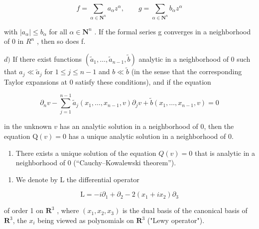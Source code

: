 \[
f = \sum_ {\alpha \in \mathbf {N} ^ {n}} a _ {\alpha} z ^ {\alpha}, \qquad g = \sum_ {\alpha \in \mathbf {N} ^ {n}} b _ {\alpha} z ^ {\alpha}
\]

with \(|a_{\alpha}| \leqslant b_{\alpha}\) for all \(\alpha \in \mathbf{N}^{n}\) . If the formal series g converges in a neighborhood of 0 in \(R^{n}\) , then so does f.

\(d)\) If there exist functions \((\widetilde{a}_1, \ldots, \widetilde{a}_{n-1}, \widetilde{b})\) analytic in a neighborhood of 0 such that \(a_j \ll \widetilde{a}_j\) for \(1 \leqslant j \leqslant n-1\) and \(b \ll \widetilde{b}\) (in the sense that the corresponding Taylor expansions at 0 satisfy these conditions), and if the equation

\[
\partial_ {n} v - \sum_ {j = 1} ^ {n - 1} \widetilde {a} _ {j} (x _ {1}, \dots , x _ {n - 1}, v) \partial_ {j} v + \widetilde {b} (x _ {1}, \dots , x _ {n - 1}, v) = 0
\]

in the unknown \(v\) has an analytic solution in a neighborhood of 0, then the equation \(\mathrm{Q}(v) = 0\) has a unique analytic solution in a neighborhood of 0.

\begin{enumerate}
\def\labelenumi{\alph{enumi})}
\setcounter{enumi}{4}
\tightlist
\item
  There exists a unique solution of the equation \(Q(v) = 0\) that is analytic in a neighborhood of 0 (“Cauchy–Kowalewski theorem”).
\end{enumerate}

\begin{enumerate}
\def\labelenumi{\arabic{enumi})}
\setcounter{enumi}{30}
\tightlist
\item
  We denote by L the differential operator
\end{enumerate}

\[
\mathrm{L} = - i \partial_ {1} + \partial_ {2} - 2 (x _ {1} + i x _ {2}) \partial_ {3}
\]

of order 1 on \(\mathbf{R}^{3}\) , where \((x_{1}, x_{2}, x_{3})\) is the dual basis of the canonical basis of \(\mathbf{R}^{3}\), the \(x_{i}\) being viewed as polynomials on \(\mathbf{R}^{3}\) ("Lewy operator").

